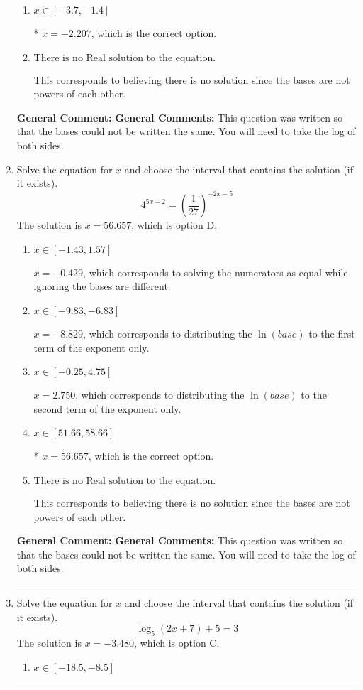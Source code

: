 \documentclass{extbook}[14pt]
\newcommand{\litem}[1]{\item #1

\rule{\textwidth}{0.4pt}}
\begin{document}
\begin{enumerate}
{\begin{enumerate}[label=\Alph*.]
$x = 16.070$, which corresponds to distributing the $\ln(base)$ to the second term of the exponent only.
\item \( x \in [-3.7, -1.4] \)

* $x = -2.207$, which is the correct option.
\item \( \text{There is no Real solution to the equation.} \)

This corresponds to believing there is no solution since the bases are not powers of each other.
\end{enumerate}

\textbf{General Comment:} \textbf{General Comments:} This question was written so that the bases could not be written the same. You will need to take the log of both sides.
}
\litem{
Solve the equation for $x$ and choose the interval that contains the solution (if it exists).
\[ 4^{5x-2} = \left(\frac{1}{27}\right)^{-2x-5} \]The solution is \( x = 56.657 \), which is option D.\begin{enumerate}[label=\Alph*.]
\item \( x \in [-1.43, 1.57] \)

$x = -0.429$, which corresponds to solving the numerators as equal while ignoring the bases are different.
\item \( x \in [-9.83, -6.83] \)

$x = -8.829$, which corresponds to distributing the $\ln(base)$ to the first term of the exponent only.
\item \( x \in [-0.25, 4.75] \)

$x = 2.750$, which corresponds to distributing the $\ln(base)$ to the second term of the exponent only.
\item \( x \in [51.66, 58.66] \)

* $x = 56.657$, which is the correct option.
\item \( \text{There is no Real solution to the equation.} \)

This corresponds to believing there is no solution since the bases are not powers of each other.
\end{enumerate}

\textbf{General Comment:} \textbf{General Comments:} This question was written so that the bases could not be written the same. You will need to take the log of both sides.
}
\litem{
Solve the equation for $x$ and choose the interval that contains the solution (if it exists).
\[ \log_{5}{(2x+7)}+5 = 3 \]The solution is \( x = -3.480 \), which is option C.\begin{enumerate}[label=\Alph*.]
\item \( x \in [-18.5, -8.5] \)


\end{enumerate}}
\end{enumerate}
\end{document}
